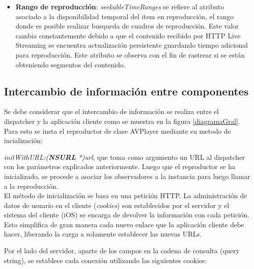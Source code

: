 \begin{itemize}
\item \textbf{Rango de reproducción}: \textit{seekableTimeRanges} se refiere al atributo asociado a la disponibilidad temporal del item en reproducción, el rango donde es posible realizar busqueda de cuadros de reproducción. Este valor cambia constantemente debido a que el contenido recibido por HTTP Live Streaming se encuentra actualización persistente guardando tiempo adicional para reproducción. Este atributo se observa con el fin de rastrear si se están obteniendo segmentos del contenido.


\end{itemize}

		
\subsection{Intercambio de información entre componentes}

Se debe considerar que el intercambio de información se realiza entre el dispatcher y la aplicación cliente como se muestra en la figura \ref{diagramaGral}. Para esto se insta el reproductor de clase AVPlayer mediante su metodo de incialización:

\textit{initWithURL:(\textbf{NSURL} *)url}, que toma como argumento un URL al dispatcher con los parámetros explicados anteriormente. Luego que el reproductor se ha inicializado, se procede a asociar los observadores a la instancia para luego llamar a la reproducción.\\

El método de inicialización se basa en una petición HTTP. La administración de datos de usuario en el cliente (\textit{cookies}) son establecidos por el servidor y el sistema del cliente (iOS) se encarga de devolver la información con cada petición. Esto simplifica de gran manera cada nuevo enlace que la aplicación cliente debe hacer, liberando la carga a solamente establecer las nuevas URLs.

Por el lado del servidor, aparte de los campos en la cadena de consulta (query string), se establece cada conexión utilizando las siguientes cookies:

